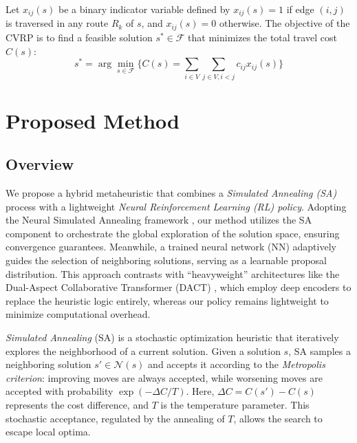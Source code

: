 \documentclass[letterpaper]{article} %
\begin{document}
Let $x_{ij}(s)$ be a binary indicator variable defined by $x_{ij}(s) = 1$ if edge $(i,j)$ is traversed in any route $R_k$ of $s$, and $x_{ij}(s) = 0$ otherwise. The objective of the CVRP is to find a feasible solution $s^* \in \mathcal{F}$ that minimizes the total travel cost $C(s)$:
$$
s^* = \arg\min_{s \in \mathcal{F}} \Big\{ C(s) = \sum_{i \in V} \sum_{j \in V, i < j} c_{ij} x_{ij}(s) \Big\}
$$

\section{Proposed Method}

\subsection{Overview}

We propose a hybrid metaheuristic that combines a \textit{Simulated Annealing (SA)} process with a lightweight \textit{Neural Reinforcement Learning (RL) policy}. Adopting the Neural Simulated Annealing framework \citep{correia_neural_2023}, our method utilizes the SA component to orchestrate the global exploration of the solution space, ensuring convergence guarantees. Meanwhile, a trained neural network (NN) adaptively guides the selection of neighboring solutions, serving as a learnable proposal distribution. This approach contrasts with ``heavyweight'' architectures like the Dual-Aspect Collaborative Transformer (DACT) \citep{ma_learning_2021}, which employ deep encoders to replace the heuristic logic entirely, whereas our policy remains lightweight to minimize computational overhead.

\textit{Simulated Annealing} (SA) is a stochastic optimization heuristic that iteratively explores the neighborhood of a current solution. Given a solution $s$, SA samples a neighboring solution $s' \in \mathcal{N}(s)$ and accepts it according to the \textit{Metropolis criterion}: improving moves are always accepted, while worsening moves are accepted with probability $\exp(-\Delta C / T)$. Here, $\Delta C = C(s') - C(s)$ represents the cost difference, and $T$ is the temperature parameter. This stochastic acceptance, regulated by the annealing of $T$, allows the search to escape local optima.
\end{document}
